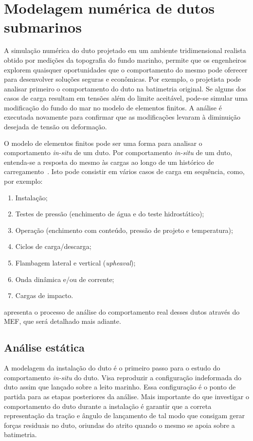 \section{Modelagem numérica de dutos submarinos}\label{sec:assentamento}


A simulação numérica do duto projetado em um ambiente tridimensional realista obtido por medições da topografia do fundo marinho, permite que os engenheiros explorem quaisquer oportunidades que o comportamento do mesmo pode oferecer para desenvolver soluções seguras e econômicas. %
Por exemplo, o projetista pode analisar primeiro o comportamento do duto na batimetria original.
Se alguns dos casos de carga resultam em tensões além do limite aceitável, pode-se simular uma modificação do fundo do mar no modelo de elementos finitos.
A análise é executada novamente para confirmar que as modificações levaram à diminuição desejada de tensão ou deformação.

O modelo de elementos finitos pode ser uma forma para analisar o comportamento \textit{in-situ} de um duto.
Por comportamento \textit{in-situ} de um duto, entenda-se a resposta do mesmo às cargas ao longo de um histórico de carregamento~\cite{Bai2014}. Isto pode consistir em vários casos de carga em sequência, como, por exemplo:

\begin{enumerate}
    \item Instalação;
    \item Testes de pressão (enchimento de água e do teste hidrostático);
    \item Operação (enchimento com conteúdo, pressão de projeto e temperatura);
    \item Ciclos de carga/descarga;
    \item Flambagem lateral e vertical (\textit{upheaval});
    \item Onda dinâmica e/ou de corrente;
    \item Cargas de impacto.
\end{enumerate}

 apresenta o processo de análise do comportamento real desses dutos através do MEF, que será detalhado mais adiante.


\subsection{Análise estática}


A modelagem da instalação do duto é o primeiro passo para o estudo do comportamento \textit{in-situ} do duto. Visa reproduzir a configuração indeformada do duto assim que lançado sobre a leito marinho.
Essa configuração é o ponto de partida para as etapas posteriores da análise.
Mais importante do que investigar o comportamento do duto durante a instalação é garantir que a correta representação da tração e ângulo de lançamento de tal modo que consigam gerar forças residuais no duto, oriundas do atrito quando o mesmo se apoia sobre a batimetria.

